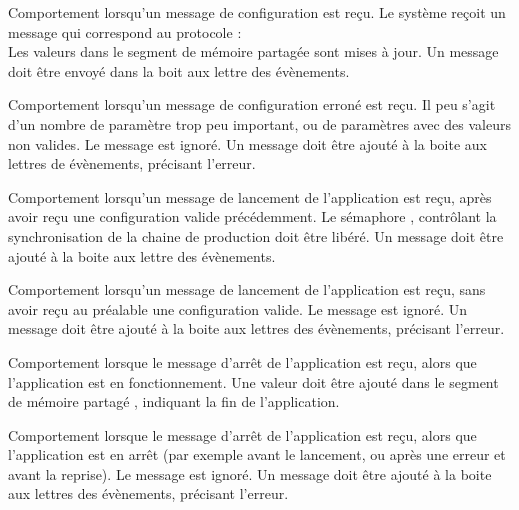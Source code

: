 {Comportement lorsqu'un message de configuration est reçu.} 
{Le système reçoit un message qui correspond au protocole :\\
Les valeurs dans le segment de mémoire partagée  sont mises à jour.
Un message doit être envoyé dans la boit aux lettre des évènements.}

{Comportement lorsqu'un message de configuration erroné est reçu. Il peu s'agit
    d'un nombre de paramètre trop peu important, ou de paramètres avec des
	valeurs non valides.}
{Le message est ignoré. Un message doit être ajouté à la boite aux lettres de
    évènements, précisant l'erreur.}

{Comportement lorsqu'un message de lancement de l'application est reçu, après
    avoir reçu une configuration valide précédemment.}
{Le sémaphore , contrôlant la synchronisation de la
    chaine de production doit être libéré. Un message doit être ajouté à la
	boite aux lettre des évènements.}

{Comportement lorsqu'un message de lancement de l'application est reçu, sans
    avoir reçu au préalable une configuration valide.}
{Le message est ignoré. Un message doit être ajouté à la boite aux lettres des
    évènements, précisant l'erreur.}

{Comportement lorsque le message d'arrêt de l'application est reçu, alors que
    l'application est en fonctionnement.}
{Une valeur doit être ajouté dans le segment de mémoire partagé ,
    indiquant la fin de l'application.}

{Comportement lorsque le message d'arrêt de l'application est reçu, alors que
    l'application est en arrêt (par exemple avant le lancement, ou après une
	    erreur et avant la reprise).}
{Le message est ignoré. Un message doit être ajouté à la boite aux lettres des
    évènements, précisant l'erreur.}

